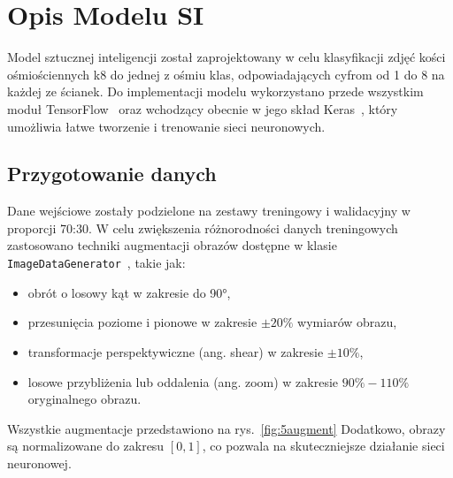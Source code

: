 \section{Opis Modelu SI}\label{sec:opis-modelu-si}

Model sztucznej inteligencji został zaprojektowany w celu klasyfikacji zdjęć kości ośmiościennych k8 do jednej z ośmiu klas,
odpowiadających cyfrom od 1 do 8 na każdej ze ścianek.
Do implementacji modelu wykorzystano przede wszystkim moduł TensorFlow~\cite{tensorflow_docs}
oraz wchodzący obecnie w jego skład Keras~\cite{keras_docs},
który umożliwia łatwe tworzenie i trenowanie sieci neuronowych.




\subsection{Przygotowanie danych}\label{subsec:przygotowanie-danych}

Dane wejściowe zostały podzielone na zestawy treningowy i walidacyjny w proporcji 70:30.
W celu zwiększenia różnorodności danych treningowych zastosowano techniki augmentacji obrazów dostępne w klasie
\texttt{ImageDataGenerator}~\cite{keras_imagedatagenerator}, takie jak:

\begin{itemize}
    \item obrót o losowy kąt w zakresie do 90°,
    \item przesunięcia poziome i pionowe w zakresie $\pm 20\%$ wymiarów obrazu,
    \item transformacje perspektywiczne (ang. shear) w zakresie $\pm 10\%$,
    \item losowe przybliżenia lub oddalenia (ang. zoom) w zakresie $90\%-110\%$ oryginalnego obrazu.
\end{itemize}

Wszystkie augmentacje przedstawiono na rys.~\ref{fig:5augment}
Dodatkowo, obrazy są normalizowane do zakresu $[0, 1]$, co pozwala na skuteczniejsze działanie sieci neuronowej.


